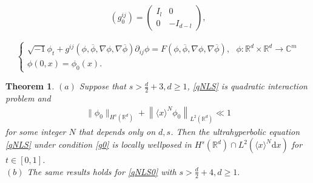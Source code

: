 \documentclass[10pt,a4paper]{amsart}
\newtheorem{thm}{Theorem}
\def\geq{\geqslant}
\begin{document}
\begin{align} \label{g0}
	\left(g_0^{ij}\right)=  \left(\begin{array}{cc}
	I_l &0\\
		0 & -I_{d-l}	
	\end{array}\right),
\end{align}

	\begin{equation}	 \label{qNLS0}
	\begin{cases}
		\sqrt{-1}\phi_t+g^{ij}\left(\phi,\overline{\phi},\nabla\phi, \nabla \overline{\phi} \right) \partial_{ij} \phi=F\left(\phi,\overline{\phi},\nabla\phi, \nabla \overline{\phi}\right),~~~\phi: \mathbb{R}^d \times \mathbb{R}^d\rightarrow \mathbb{C}^m\\
		\phi(0,x)=\phi_0(x).
	\end{cases}
\end{equation}

\begin{thm} \label{thm2}
$ 	(a) $ Suppose that    $ s>\frac {d}2+3, d \geq 1  $,  \eqref{qNLS} is  quadratic interaction problem and
\begin{align*}
	   \|\phi_0\|_{H^s(\mathbb{R}^d)} +\left\| \langle x\rangle^N \phi_0 \right\|_{L^2(\mathbb{R}^d)}\ll 1
\end{align*}  
  for   some integer $ N $ that depends only on $ d, s $.   Then  the ultrahyperbolic equation \eqref{qNLS} under condition   \eqref{g0} is locally wellposed in $   H^{s} (\mathbb{R}^d) \cap L^2(\langle x\rangle^N \mathrm{d}x) $ for $ t\in [0,1] $.\\
$ (b) $ The same results holds for \eqref{qNLS0} with $ s>\frac{d}{2}+4, d\geq 1. $
\end{thm}
\end{document}
